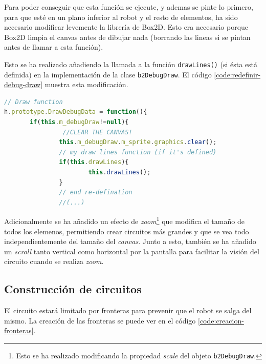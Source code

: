Para poder conseguir que esta función se ejecute, y ademas se pinte lo primero, para que esté en un plano inferior al robot y el resto de elementos, ha sido necesario modificar levemente la librería de Box2D. Esto era necesario porque Box2D limpia el canvas antes de dibujar nada (borrando las lineas si se pintan antes de llamar a esta función).

Esto se ha realizado añadiendo la llamada a la función \texttt{drawLines()} (si ésta está definida) en la implementación de la clase \texttt{b2DebugDraw}. El código \ref{code:redefinir-debug-draw} muestra esta modificación.

\begin{lstlisting}[language={Javascript},label={code:redefinir-debug-draw}, caption={Modificación de la librería de Box2D para poder dibujar de manera correcta las lineas.}]
// Draw function 
h.prototype.DrawDebugData = function(){ 
	   if(this.m_debugDraw!=null){
	   			//CLEAR THE CANVAS!
			   this.m_debugDraw.m_sprite.graphics.clear(); 
			   // my draw lines function (if it's defined)
			   if(this.drawLines){
					   this.drawLines();
			   }
			   // end re-defination
			   //(...)
\end{lstlisting}

Adicionalmente se ha añadido un efecto de \emph{zoom}\footnote{Esto se ha realizado modificando la propiedad \emph{scale} del objeto \texttt{b2DebugDraw}.} que modifica el tamaño de todos los elemenos, permitiendo crear circuitos más grandes y que se vea todo independientemente del tamaño del \emph{canvas}. Junto a esto, también se ha añadido un \emph{scroll} tanto vertical como horizontal por la pantalla para facilitar la visión del circuito cuando se realiza \emph{zoom}.


\subsection{Construcción de circuitos}
\label{sec:construccion-circuitos}

El circuito estará limitado por fronteras para prevenir que el robot se salga del mismo. La creación de las fronteras se puede ver en el código \ref{code:creacion-fronteras}.

